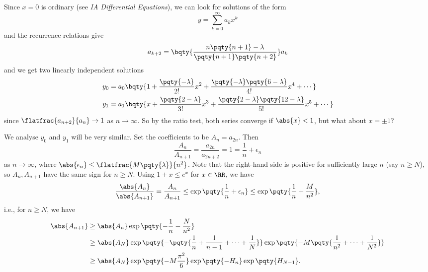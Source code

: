 Since \(x = 0\) is ordinary (see \textit{IA Differential Equations}), we can look for solutions of the form
\begin{equation}
    y = \sum_{k = 0}^{\infty} a_k x^k
\end{equation}
and the recurrence relations give
\begin{equation}
    \label{eq:recurrence-relation}%
    a_{k + 2} = \bqty{\frac{n \pqty{n + 1} - \lambda}{\pqty{n + 1} \pqty{n + 2}}} a_k
\end{equation}
and we get two linearly independent solutions
\begin{subequations}
    \begin{align}
        y_0 &= a_0 \bqty{1 + \frac{\pqty{- \lambda}}{2!} x^2 + \frac{\pqty{- \lambda} \pqty{6 - \lambda}}{4!} x^4 + \cdots} \\
        y_1 &= a_1 \bqty{x + \frac{\pqty{2 - \lambda}}{3!} x^3 + \frac{\pqty{2 - \lambda} \pqty{12 - \lambda}}{5!} x^5 + \cdots}
    \end{align}
\end{subequations}
since \(\flatfrac{a_{n + 2}}{a_n} \to 1\) as \(n \to \infty\). So by the ratio test, both series converge if \(\abs{x} < 1\), but what about \(x = \pm 1\)?

\small

We analyse \(y_0\) and \(y_1\) will be very similar. Set the coefficients to be \(A_n = a_{2n}\). Then
\begin{equation}
    \frac{A_n}{A_{n + 1}} = \frac{a_{2n}}{a_{2n + 2}} = 1 = \frac{1}{n} + \epsilon_n
\end{equation}
as \(n \to \infty\), where \(\abs{\epsilon_n} \leq \flatfrac{M \pqty{\lambda}}{n^2}\). Note that the right-hand side is positive for sufficiently large \(n\) (say \(n \geq N\)), so \(A_n, A_{n + 1}\) have the same sign for \(n \geq N\). Using \(1 + x \leq e^x\) for \(x \in \RR\), we have
\begin{equation}
    \frac{\abs{A_n}}{\abs{A_{n + 1}}} = \frac{A_n}{A_{n + 1}} \leq \exp\pqty{\frac{1}{n} + \epsilon_n} \leq \exp\pqty{\frac{1}{n} + \frac{M}{n^2}}, 
\end{equation}
i.e., for \(n \geq N\), we have
\begin{subequations}
    \begin{align}
        \abs{A_{n + 1}} &\geq\abs{A_n} \exp\pqty{- \frac{1}{n} - \frac{N}{n^2}} \\
        &\geq \abs{A_N} \exp\pqty{- \pqty{\frac{1}{n} + \frac{1}{n - 1} + \cdots + \frac{1}{N}}} \exp \pqty{- M \pqty{\frac{1}{n^2} + \cdots + \frac{1}{N^2}}} \\
        &\geq \abs{A_N} \exp\pqty{-M \frac{\pi^2}{6}} \exp\pqty{- H_n} \exp\pqty{H_{N - 1}}.
    \end{align}
\end{subequations}

